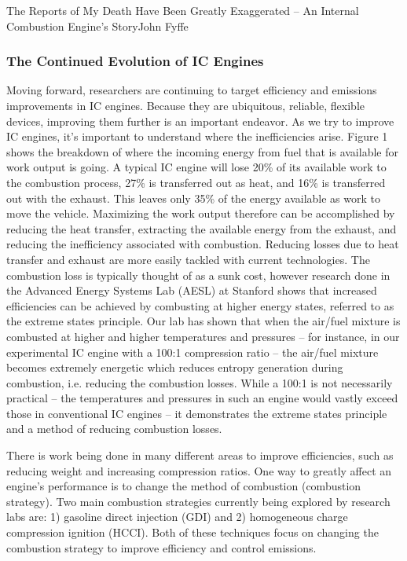\documentclass{papertex}
\begin{document}
\begin{news}{2}{The Reports of My Death Have Been Greatly Exaggerated -- An Internal Combustion Engine’s Story}{John Fyffe}{}{}
\subsubsection*{The Continued Evolution of IC Engines}

Moving forward, researchers are continuing to target efficiency and emissions 
improvements in IC engines.  Because they are ubiquitous, reliable, flexible 
devices, improving them further is an important endeavor.  As we try to 
improve IC engines, it’s important to understand where the inefficiencies 
arise.  Figure 1 shows the breakdown of where the incoming energy from fuel 
that is available for work output is going. A typical IC engine will lose 
20\% of its available work to the combustion process, 27\% is transferred 
out as heat, and 16\% is transferred out with the exhaust. This leaves only 
35\% of the energy available as work to move the vehicle.  Maximizing the work 
output therefore can be accomplished by reducing the heat transfer, 
extracting the available energy from the exhaust, and reducing the 
inefficiency associated with combustion.  Reducing losses due to heat transfer 
and exhaust are more easily tackled with current technologies.  The 
combustion loss is typically thought of as a sunk cost, however research 
done in the Advanced Energy Systems Lab (AESL) at Stanford shows that 
increased efficiencies can be achieved by combusting at higher energy states, 
referred to as the extreme states principle.  Our lab has shown that when the 
air/fuel mixture is combusted at higher and higher temperatures and 
pressures – for instance, in our experimental IC engine with a 100:1 
compression ratio – the air/fuel mixture becomes extremely energetic which 
reduces entropy generation during combustion, i.e. reducing the combustion 
losses.  While a 100:1 is not necessarily practical – the temperatures and 
pressures in such an engine would vastly exceed those in conventional IC 
engines – it demonstrates the extreme states principle and a method of 
reducing combustion losses.


There is work being done in many different areas to improve efficiencies, 
such as reducing weight and increasing compression ratios. One way to greatly 
affect an engine’s performance is to change the method of combustion 
(combustion strategy).  Two main combustion strategies currently being 
explored by research labs are: 1) gasoline direct injection (GDI) and 2) 
homogeneous charge compression ignition (HCCI).  Both of these techniques 
focus on changing the combustion strategy to improve efficiency and control 
emissions.


\end{news}
\end{document}
